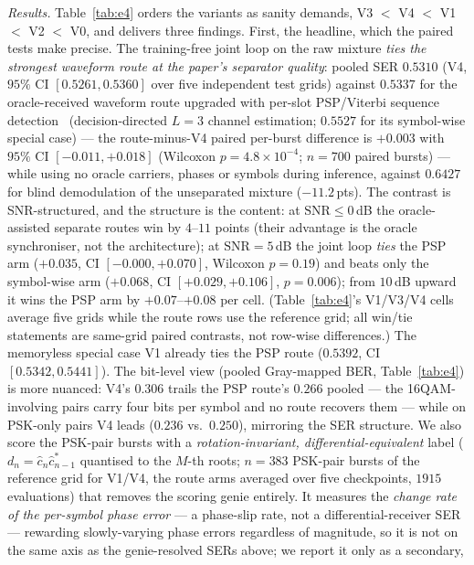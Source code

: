 \documentclass[journal]{IEEEtran}
\newcommand{\snr}{\mathrm{SNR}}
\begin{document}
\emph{Results.} Table~\ref{tab:e4} orders the variants as sanity
demands, V3 $<$ V4 $<$ V1 $<$ V2 $<$ V0, and delivers three findings.
First, the headline, which the paired tests make precise. The
training-free joint loop on the raw mixture \emph{ties the strongest
waveform route at the paper's separator quality}: pooled SER $0.5310$ (V4, $95\%$ CI
$[0.5261, 0.5360]$ over five independent test grids) against $0.5337$
for the oracle-received waveform route upgraded with per-slot
PSP/Viterbi sequence detection~\cite{raheli1995psp,forney1972mlse} (decision-directed $L{=}3$ channel
estimation; $0.5527$ for its symbol-wise special case) --- the
route-minus-V4 paired per-burst difference is $+0.003$ with $95\%$ CI
$[-0.011, +0.018]$
(Wilcoxon $p{=}4.8\times 10^{-4}$; $n{=}700$ paired bursts) --- while
using no oracle carriers, phases or symbols during inference,
against $0.6427$ for blind
demodulation of the unseparated mixture ($-11.2$\,pts). The contrast
is SNR-structured, and the structure is the content: at
$\snr \leq 0$\,dB the oracle-assisted separate routes win by
$4$--$11$ points (their advantage is the oracle synchroniser, not the
architecture); at $\snr {=} 5$\,dB the joint loop \emph{ties} the PSP
arm ($+0.035$, CI $[-0.000, +0.070]$, Wilcoxon $p{=}0.19$) and beats
only the symbol-wise arm ($+0.068$, CI $[+0.029, +0.106]$,
$p{=}0.006$); from $10$\,dB upward it wins the PSP arm by
$+0.07$--$+0.08$ per cell. (Table~\ref{tab:e4}'s V1/V3/V4 cells average
five grids while the route rows use the reference grid; all win/tie
statements are same-grid paired contrasts, not row-wise differences.)
The memoryless special case V1 already ties the
PSP route ($0.5392$, CI $[0.5342, 0.5441]$). The bit-level view
(pooled Gray-mapped BER, Table~\ref{tab:e4}) is more nuanced: V4's
$0.306$ trails the PSP route's $0.266$ pooled --- the 16QAM-involving
pairs carry four bits per symbol and no route recovers them --- while
on PSK-only pairs V4 leads ($0.236$ vs.\ $0.250$), mirroring the SER
structure. We also score the PSK-pair bursts with a
\emph{rotation-invariant, differential-equivalent} label
($d_n = \hat c_n \hat c_{n-1}^{*}$ quantised to the $M$-th roots;
$n{=}383$ PSK-pair bursts of the reference grid for V1/V4, the route
arms averaged over five checkpoints, $1915$ evaluations) that removes the
scoring genie entirely. It measures the \emph{change rate of the
per-symbol phase error} --- a phase-slip rate, not a
differential-receiver SER --- rewarding slowly-varying phase errors
regardless of magnitude, so it is not on the same axis as the
genie-resolved SERs above; we report it only as a secondary,
\end{document}
